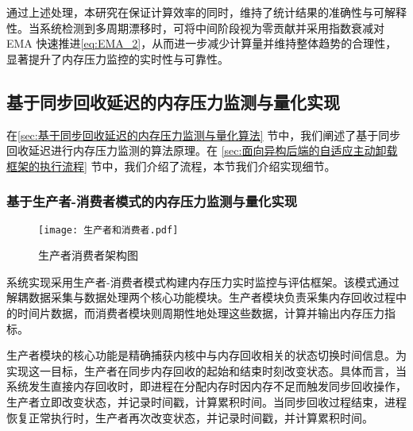 
通过上述处理，本研究在保证计算效率的同时，维持了统计结果的准确性与可解释性。当系统检测到多周期漂移时，可将中间阶段视为零贡献并采用指数衰减对 EMA 快速推进\ref{eq:EMA_2}，从而进一步减少计算量并维持整体趋势的合理性，显著提升了内存压力监控的实时性与可靠性。



\subsection{基于同步回收延迟的内存压力监测与量化实现}

在\ref{sec:基于同步回收延迟的内存压力监测与量化算法} 节中，我们阐述了基于同步回收延迟进行内存压力监测的算法原理。在 \ref{sec:面向异构后端的自适应主动卸载框架的执行流程} 节中，我们介绍了流程，本节我们介绍实现细节。

\subsubsection{基于生产者-消费者模式的内存压力监测与量化实现}

\begin{figure}[H]
    \centering
    \texttt{[image: 生产者和消费者.pdf]}
    \caption{生产者消费者架构图}
    \label{fig:producer-consumer}
\end{figure}



系统实现采用生产者-消费者模式构建内存压力实时监控与评估框架。该模式通过解耦数据采集与数据处理两个核心功能模块。生产者模块负责采集内存回收过程中的时间片数据，而消费者模块则周期性地处理这些数据，计算并输出内存压力指标。

生产者模块的核心功能是精确捕获内核中与内存回收相关的状态切换时间信息。为实现这一目标，生产者在同步内存回收的起始和结束时刻改变状态。具体而言，当系统发生直接内存回收时，即进程在分配内存时因内存不足而触发同步回收操作，生产者立即改变状态，并记录时间戳，计算累积时间。当同步回收过程结束，进程恢复正常执行时，生产者再次改变状态，并记录时间戳，并计算累积时间。

